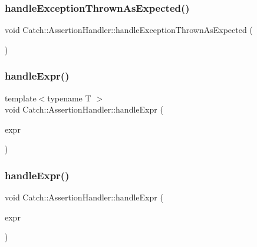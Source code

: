\subsubsection{\texorpdfstring{handleExceptionThrownAsExpected()}{handleExceptionThrownAsExpected()}}
{\footnotesize\ttfamily void Catch\+::\+Assertion\+Handler\+::handle\+Exception\+Thrown\+As\+Expected (\begin{DoxyParamCaption}{ }\end{DoxyParamCaption})}

\mbox{\label{class_catch_1_1_assertion_handler_a2ef387e567bad90ec6e4b5bf5c367388}} 
\subsubsection{\texorpdfstring{handleExpr()}{handleExpr()}\hspace{0.1cm}{\footnotesize\ttfamily [1/2]}}
{\footnotesize\ttfamily template$<$typename T $>$ \\
void Catch\+::\+Assertion\+Handler\+::handle\+Expr (\begin{DoxyParamCaption}\item[{\mbox{\hyperlink{class_catch_1_1_expr_lhs}{Expr\+Lhs}}$<$ T $>$ const \&}]{expr }\end{DoxyParamCaption})\hspace{0.3cm}{\ttfamily [inline]}}

\mbox{\label{class_catch_1_1_assertion_handler_afe14d9cf1b1c7f70dae439fbdb51d0c4}} 
\subsubsection{\texorpdfstring{handleExpr()}{handleExpr()}\hspace{0.1cm}{\footnotesize\ttfamily [2/2]}}
{\footnotesize\ttfamily void Catch\+::\+Assertion\+Handler\+::handle\+Expr (\begin{DoxyParamCaption}\item[{\mbox{\hyperlink{struct_catch_1_1_i_transient_expression}{I\+Transient\+Expression}} const \&}]{expr }\end{DoxyParamCaption})}

